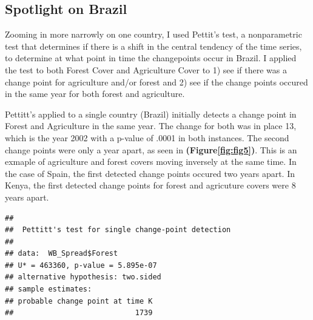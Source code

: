 \documentclass[12pt,]{article}
\newenvironment{Shaded}{\begin{snugshade}}{\end{snugshade}}
\newcommand{\KeywordTok}[1]{\textcolor[rgb]{0.13,0.29,0.53}{\textbf{#1}}}
\newcommand{\StringTok}[1]{\textcolor[rgb]{0.31,0.60,0.02}{#1}}
\newcommand{\CommentTok}[1]{\textcolor[rgb]{0.56,0.35,0.01}{\textit{#1}}}
\newcommand{\OperatorTok}[1]{\textcolor[rgb]{0.81,0.36,0.00}{\textbf{#1}}}
\newcommand{\NormalTok}[1]{#1}
\begin{document}
\subsection{Spotlight on Brazil}\label{spotlight-on-brazil}

Zooming in more narrowly on one country, I used Pettit's test, a
nonparametric test that determines if there is a shift in the central
tendency of the time series, to determine at what point in time the
changepoints occur in Brazil. I applied the test to both Forest Cover
and Agriculture Cover to 1) see if there was a change point for
agriculture and/or forest and 2) see if the change points occured in the
same year for both forest and agriculture.

Pettitt's applied to a single country (Brazil) initially detects a
change point in Forest and Agriculture in the same year. The change for
both was in place 13, which is the year 2002 with a p-value of .0001 in
both instances. The second change points were only a year apart, as seen
in \textbf{(Figure\ref{fig:fig5})}. This is an exmaple of agriculture
and forest covers moving inversely at the same time. In the case of
Spain, the first detected change points occured two years apart. In
Kenya, the first detected change points for forest and agricuture covers
were 8 years apart.

\begin{Shaded}
\end{Shaded}

\begin{verbatim}
## 
##  Pettitt's test for single change-point detection
## 
## data:  WB_Spread$Forest
## U* = 463360, p-value = 5.895e-07
## alternative hypothesis: two.sided
## sample estimates:
## probable change point at time K 
##                            1739
\end{verbatim}

\begin{Shaded}
\end{Shaded}
\end{document}
